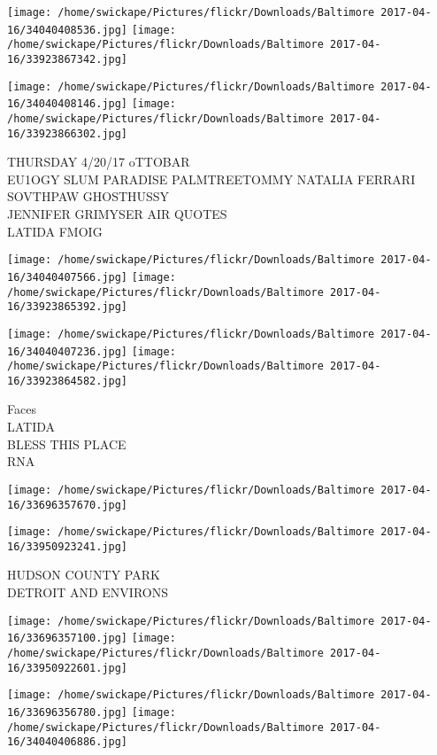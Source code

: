 \documentclass[10pt,letterpaper]{article}
\begin{document}
\texttt{[image: /home/swickape/Pictures/flickr/Downloads/Baltimore 2017-04-16/34040408536.jpg]}
\texttt{[image: /home/swickape/Pictures/flickr/Downloads/Baltimore 2017-04-16/33923867342.jpg]}

\texttt{[image: /home/swickape/Pictures/flickr/Downloads/Baltimore 2017-04-16/34040408146.jpg]}
\texttt{[image: /home/swickape/Pictures/flickr/Downloads/Baltimore 2017-04-16/33923866302.jpg]}

THURSDAY 4/20/17 oTTOBAR\\
EU1OGY SLUM PARADISE PALMTREETOMMY NATALIA FERRARI SOVTHPAW GHOSTHUSSY\\
JENNIFER GRIMYSER AIR QUOTES\\
LATIDA FMOIG\\
\pagebreak

\texttt{[image: /home/swickape/Pictures/flickr/Downloads/Baltimore 2017-04-16/34040407566.jpg]}
\texttt{[image: /home/swickape/Pictures/flickr/Downloads/Baltimore 2017-04-16/33923865392.jpg]}

\texttt{[image: /home/swickape/Pictures/flickr/Downloads/Baltimore 2017-04-16/34040407236.jpg]}
\texttt{[image: /home/swickape/Pictures/flickr/Downloads/Baltimore 2017-04-16/33923864582.jpg]}

Faces\\
LATIDA\\
BLESS THIS PLACE\\
RNA\\
\pagebreak

\texttt{[image: /home/swickape/Pictures/flickr/Downloads/Baltimore 2017-04-16/33696357670.jpg]}

\vspace{0.25in}
\texttt{[image: /home/swickape/Pictures/flickr/Downloads/Baltimore 2017-04-16/33950923241.jpg]}

HUDSON COUNTY PARK\\
DETROIT AND ENVIRONS\\
\pagebreak

\texttt{[image: /home/swickape/Pictures/flickr/Downloads/Baltimore 2017-04-16/33696357100.jpg]}
\texttt{[image: /home/swickape/Pictures/flickr/Downloads/Baltimore 2017-04-16/33950922601.jpg]}

\texttt{[image: /home/swickape/Pictures/flickr/Downloads/Baltimore 2017-04-16/33696356780.jpg]}
\texttt{[image: /home/swickape/Pictures/flickr/Downloads/Baltimore 2017-04-16/34040406886.jpg]}
\end{document}
